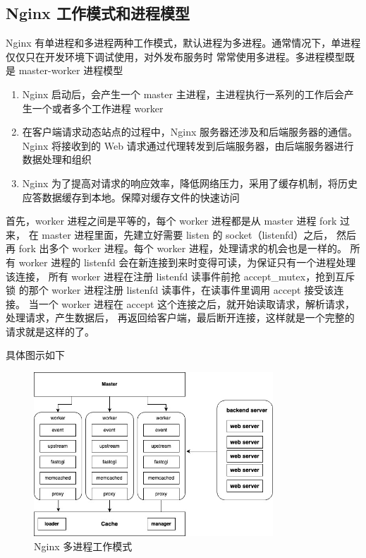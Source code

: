 \subsection{Nginx 工作模式和进程模型}

Nginx 有单进程和多进程两种工作模式，默认进程为多进程。通常情况下，单进程仅仅只在开发环境下调试使用，对外发布服务时
常常使用多进程。多进程模型既是 master-worker 进程模型

\noindent\begin{enumerate}
  \item Nginx 启动后，会产生一个 master 主进程，主进程执行一系列的工作后会产生一个或者多个工作进程 worker
  \item 在客户端请求动态站点的过程中，Nginx 服务器还涉及和后端服务器的通信。Nginx 将接收到的 Web 请求通过代理转发到后端服务器，由后端服务器进行数据处理和组织
  \item Nginx 为了提高对请求的响应效率，降低网络压力，采用了缓存机制，将历史应答数据缓存到本地。保障对缓存文件的快速访问
\end{enumerate}

首先，worker 进程之间是平等的，每个 worker 进程都是从 master 进程 fork 过来，
在 master 进程里面，先建立好需要 listen 的 socket（listenfd）之后，
然后再 fork 出多个 worker 进程。每个 worker 进程，处理请求的机会也是一样的。
所有 worker 进程的 listenfd 会在新连接到来时变得可读，为保证只有一个进程处理该连接，
所有 worker 进程在注册 listenfd 读事件前抢 accept\_mutex，抢到互斥锁
的那个 worker 进程注册 listenfd 读事件，在读事件里调用 accept 接受该连接。
当一个 worker 进程在 accept 这个连接之后，就开始读取请求，解析请求，处理请求，产生数据后，
再返回给客户端，最后断开连接，这样就是一个完整的请求就是这样的了。

具体图示如下

\noindent\begin{figure}[htb]
  \centering
  \includegraphics[width=0.8\textwidth]{figures/master-worker.jpg}
  \caption{Nginx 多进程工作模式}
\end{figure}

